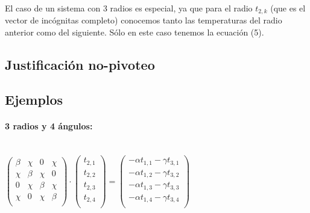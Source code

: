 \documentclass[12pt]{article}
\newcommand{\Gpmatrix}[1]{\ensuremath{\begin{pmatrix} #1 \end{pmatrix}}}
\newcommand{\sub}[3]{\ensuremath{#1_{#2,#3}}}
\begin{document}
\paragraph{} El caso de un sistema con 3 radios es especial, ya que para el radio \(\sub{t}{2}{k}\) (que es el vector de incógnitas completo) conocemos tanto las temperaturas del radio anterior como del siguiente. Sólo en este caso tenemos la ecuación (5).

\subsection{Justificación no-pivoteo} 
\label{sec:justificacion}


\subsection{Ejemplos}

\paragraph{3 radios y 4 ángulos:} \ \\

\(
\Gpmatrix{
  \beta & \chi & 0 & \chi \\
  \chi & \beta & \chi & 0 \\
  0 & \chi & \beta & \chi \\
  \chi & 0 & \chi & \beta \\
} \cdot \Gpmatrix{
  \sub{t}{2}{1} \\
  \sub{t}{2}{2} \\
  \sub{t}{2}{3} \\
  \sub{t}{2}{4} \\
} = \Gpmatrix{
  -\alpha\sub{t}{1}{1} - \gamma\sub{t}{3}{1} \\
  -\alpha\sub{t}{1}{2} - \gamma\sub{t}{3}{2} \\
  -\alpha\sub{t}{1}{3} - \gamma\sub{t}{3}{3} \\
  -\alpha\sub{t}{1}{4} - \gamma\sub{t}{3}{4} \\
}
\)

\end{document}
